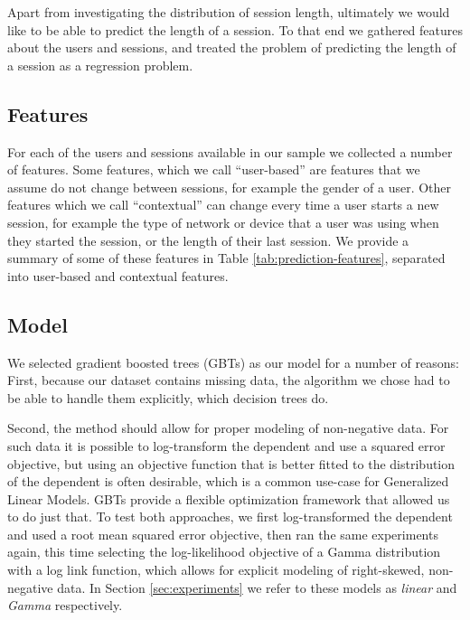 
Apart from investigating the distribution of session length, ultimately we would like to
be able to predict the length of a session. To that end we gathered
features about the users and sessions, and treated the problem of predicting the
length of a session as a regression problem.


\subsection{Features}

For each of the users and sessions available in our sample we collected
a number of features.
Some features, which we call ``user-based''
are features that we assume do not change between sessions, for example
the gender of a user. Other features which we call ``contextual'' can change
every time a user starts a new session, for example the type of network or device
that a user was using when they started the session, or the length of their last session.
We provide a summary of some of these
features in Table \ref{tab:prediction-features}, separated into user-based and contextual
features.


\subsection{Model}

\label{subsec:model}


We selected gradient boosted trees (GBTs) \cite{friedman2001gbt} as our model
for a number of reasons: First, because our dataset contains missing data, the algorithm we chose had to be able to handle them explicitly, which decision trees do.

Second, the method should allow for proper modeling of non-negative data.
For such data it is possible to log-transform the dependent and use a squared error objective,
but using an objective function that is better fitted to the distribution of the dependent is
often desirable, which is a common use-case for Generalized Linear Models.
GBTs provide a flexible
optimization framework that allowed us to do just that.
To test both approaches,
we first log-transformed the dependent
and used a root mean squared error objective,
then ran the same experiments again, this time selecting the log-likelihood objective of a Gamma distribution with a log link function,
which allows for explicit modeling of right-skewed, non-negative data. In Section \ref{sec:experiments} we refer to these models
as \textit{linear} and \textit{Gamma} respectively.

